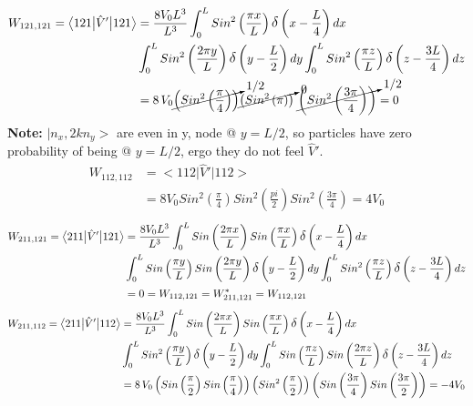 \documentclass[12pt,fancychapters]{report}
\numberwithin{equation}{section}
\begin{document}
\begin{align*}
  W_{121,121} =\big<121\big|\hat{V}'\big|121 \big> &=  \frac{8V_0L^3}{L^3}\int_{0}^{L}
  Sin^2\left(\frac{\pi x}{L}\right)\mathlarger{\delta}\left(x-\frac{L}{4}\right)dx\\
  &\int_{0}^{L}
  Sin^2\left(\frac{2\pi y}{L}\right)\mathlarger{\delta}\left(y-\frac{L}{2}\right)dy
  \int_{0}^{L}
  Sin^2\left(\frac{\pi z}{L}\right)\mathlarger{\delta}\left(z-\frac{3L}{4}\right)dz\\
  &= 8\,V_0\cancelto{1/2}{\left(Sin^2\left(\frac{\pi}{4}\right)\right)}
  \cancelto{0}{\left(Sin^2\left(\pi\right)\right)}\,\,
  \cancelto{1/2}{\left(Sin^2\left(\frac{3\pi}{4}\right)\right)} = 0
\end{align*}
\textbf{Note:} $\big|n_x,2kn_y\big>$ are even in y, node @ $y=L/2$, so particles have zero 
probability of being @ $y=L/2$, ergo they do not feel $\hat{V}'$.
\begin{align*}
  W_{112,112} &=\big<112\big|\hat{V}'\big|112 \big> \\
&= 8V_0 Sin^2\left(\frac{\pi}{4}\right)Sin^2\left(\frac{pi}{2}\right) 
Sin^2\left(\frac{3\pi}{4}\right) = 4V_0
\end{align*}
\begin{align*}
 W_{211,121} =\big<211\big|\hat{V}'\big|121 \big> &=   \frac{8V_0L^3}{L^3}\int_{0}^{L}
 Sin\left(\frac{2\pi x}{L}\right)Sin\left(\frac{\pi x}{L}\right)
 \mathlarger{\delta}\left(x-\frac{L}{4}\right)dx\\
  &\int_{0}^{L}
  Sin\left(\frac{\pi y}{L}\right)Sin\left(\frac{2\pi y}{L}\right)
  \mathlarger{\delta}\left(y-\frac{L}{2}\right)dy
  \int_{0}^{L}
  Sin^2\left(\frac{\pi z}{L}\right)\mathlarger{\delta}\left(z-\frac{3L}{4}\right)dz\\
  &= 0 = W_{112,121} = W^*_{211,121} = W_{112,121}
\end{align*}
\begin{align*}
  W_{211,112} =\big<211\big|\hat{V}'\big|112 \big> &=  \frac{8V_0L^3}{L^3}\int_{0}^{L}
  Sin\left(\frac{2\pi x}{L}\right)Sin\left(\frac{\pi x}{L}\right)
  \mathlarger{\delta}\left(x-\frac{L}{4}\right)dx\\
  &\int_{0}^{L}
  Sin^2\left(\frac{\pi y}{L}\right)\mathlarger{\delta}\left(y-\frac{L}{2}\right)dy
  \int_{0}^{L}
  Sin\left(\frac{\pi z}{L}\right)Sin\left(\frac{2\pi z}{L}\right)
  \mathlarger{\delta}\left(z-\frac{3L}{4}\right)dz\\
  &= 8\,V_0 \left(Sin\left(\frac{\pi}{2}\right)Sin\left(\frac{\pi}{4}\right)\right)
  \left(Sin^2\left(\frac{\pi}{2}\right)\right)
  \left(Sin\left(\frac{3\pi}{4}\right)Sin\left(\frac{3\pi}{2}\right)\right) = -4V_0
\end{align*}
\end{document}
